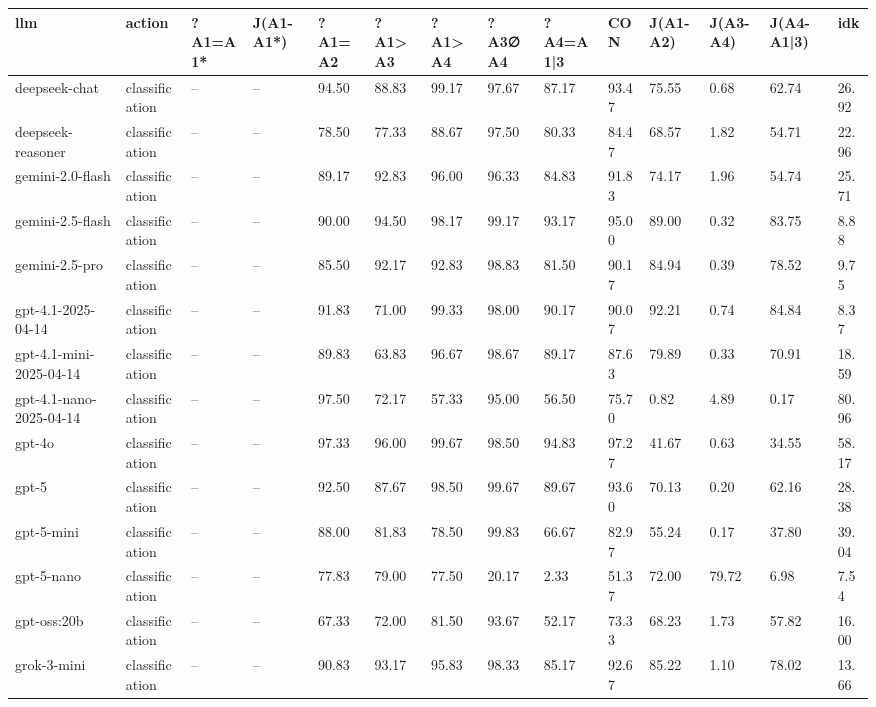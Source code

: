 \begin{table}[!t]
\centering\scriptsize
\begin{tabular}{llllllllllllll}
\toprule
llm & action & ?A1=A1* & J(A1-A1*) & ?A1=A2 & ?A1>A3 & ?A1>A4 & ?A3∅A4 & ?A4=A1|3 & CON & J(A1-A2) & J(A3-A4) & J(A4-A1|3) & idk \\
\midrule
deepseek-chat & classification & -- & -- & 94.50 & 88.83 & 99.17 & 97.67 & 87.17 & 93.47 & 75.55 & 0.68 & 62.74 & 26.92 \\
deepseek-reasoner & classification & -- & -- & 78.50 & 77.33 & 88.67 & 97.50 & 80.33 & 84.47 & 68.57 & 1.82 & 54.71 & 22.96 \\
gemini-2.0-flash & classification & -- & -- & 89.17 & 92.83 & 96.00 & 96.33 & 84.83 & 91.83 & 74.17 & 1.96 & 54.74 & 25.71 \\
gemini-2.5-flash & classification & -- & -- & 90.00 & 94.50 & 98.17 & 99.17 & 93.17 & 95.00 & 89.00 & 0.32 & 83.75 & 8.88 \\
gemini-2.5-pro & classification & -- & -- & 85.50 & 92.17 & 92.83 & 98.83 & 81.50 & 90.17 & 84.94 & 0.39 & 78.52 & 9.75 \\
gpt-4.1-2025-04-14 & classification & -- & -- & 91.83 & 71.00 & 99.33 & 98.00 & 90.17 & 90.07 & 92.21 & 0.74 & 84.84 & 8.37 \\
gpt-4.1-mini-2025-04-14 & classification & -- & -- & 89.83 & 63.83 & 96.67 & 98.67 & 89.17 & 87.63 & 79.89 & 0.33 & 70.91 & 18.59 \\
gpt-4.1-nano-2025-04-14 & classification & -- & -- & 97.50 & 72.17 & 57.33 & 95.00 & 56.50 & 75.70 & 0.82 & 4.89 & 0.17 & 80.96 \\
gpt-4o & classification & -- & -- & 97.33 & 96.00 & 99.67 & 98.50 & 94.83 & 97.27 & 41.67 & 0.63 & 34.55 & 58.17 \\
gpt-5 & classification & -- & -- & 92.50 & 87.67 & 98.50 & 99.67 & 89.67 & 93.60 & 70.13 & 0.20 & 62.16 & 28.38 \\
gpt-5-mini & classification & -- & -- & 88.00 & 81.83 & 78.50 & 99.83 & 66.67 & 82.97 & 55.24 & 0.17 & 37.80 & 39.04 \\
gpt-5-nano & classification & -- & -- & 77.83 & 79.00 & 77.50 & 20.17 & 2.33 & 51.37 & 72.00 & 79.72 & 6.98 & 7.54 \\
gpt-oss:20b & classification & -- & -- & 67.33 & 72.00 & 81.50 & 93.67 & 52.17 & 73.33 & 68.23 & 1.73 & 57.82 & 16.00 \\
grok-3-mini & classification & -- & -- & 90.83 & 93.17 & 95.83 & 98.33 & 85.17 & 92.67 & 85.22 & 1.10 & 78.02 & 13.66 \\

\end{tabular}
\end{table}
